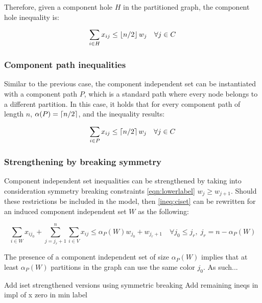 Therefore, given a component hole $H$ in the partitioned graph, the component hole inequality is:

\begin{equation}
\label{ineq:chole}
\sum _{i \in H} x_{ij} \leq \left\lfloor n / 2 \right\rfloor w_{j} \quad \forall j \in C
\end{equation}


\subsubsection*{Component path inequalities}

Similar to the previous case, the component independent set can be instantiated with a component path $P$, which is a standard path where every node belongs to a different partition. In this case, it holds that for every component path of length $n$, $\alpha(P) = \left\lceil n / 2 \right\rceil$, and the inequality results:

\begin{equation}
\label{ineq:cpath}
\sum _{i \in P} x_{ij} \leq \left\lceil n / 2 \right\rceil w_{j} \quad \forall j \in C
\end{equation}

\subsubsection*{Strengthening by breaking symmetry}

Component independent set inequalities can be strengthened by taking into consideration symmetry breaking constraints \ref{eqn:lowerlabel} $w_j \geq w_{j+1}$. Should these restrictions be included in the model, then \ref{ineq:ciset} can be rewritten for an induced component independent set $W$ as the following:

\begin{equation}
\label{ineq:cisetbs}
\sum_{i \in W} x_{ij_0} + \sum ^n _{j = j_r + 1} \sum _{i \in V} x_{ij} \leq \alpha_P(W) w_{j_0} + w_{j_r + 1} \quad \forall j_0 \leq j_r, \; j_r = n - \alpha_P(W)
\end{equation}

The presence of a component independent set of size $\alpha_P(W)$ implies that at least $\alpha_P(W)$ partitions in the graph can use the same color $j_0$. As such...

\TODO Add iset strengthened versions using symmetric breaking
\TODO Add remaining ineqs in impl of x zero in min label

